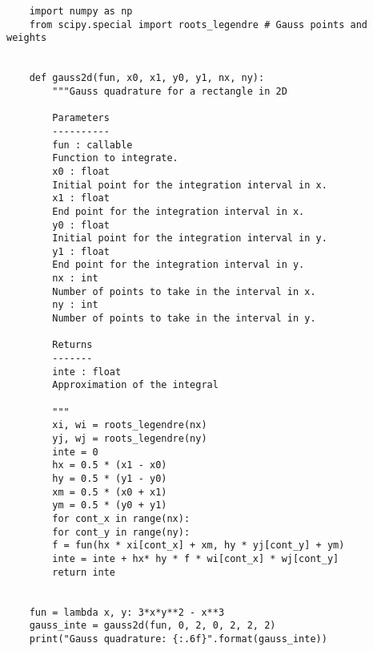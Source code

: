 \begin{verbatim}
    import numpy as np
    from scipy.special import roots_legendre # Gauss points and weights


    def gauss2d(fun, x0, x1, y0, y1, nx, ny):
        """Gauss quadrature for a rectangle in 2D
        
        Parameters
        ----------
        fun : callable
        Function to integrate.
        x0 : float
        Initial point for the integration interval in x.
        x1 : float
        End point for the integration interval in x.
        y0 : float
        Initial point for the integration interval in y.
        y1 : float
        End point for the integration interval in y.
        nx : int
        Number of points to take in the interval in x.
        ny : int
        Number of points to take in the interval in y.
        
        Returns
        -------
        inte : float
        Approximation of the integral
        
        """
        xi, wi = roots_legendre(nx)
        yj, wj = roots_legendre(ny)
        inte = 0
        hx = 0.5 * (x1 - x0)
        hy = 0.5 * (y1 - y0)
        xm = 0.5 * (x0 + x1)
        ym = 0.5 * (y0 + y1)
        for cont_x in range(nx):
        for cont_y in range(ny):
        f = fun(hx * xi[cont_x] + xm, hy * yj[cont_y] + ym)
        inte = inte + hx* hy * f * wi[cont_x] * wj[cont_y]
        return inte


    fun = lambda x, y: 3*x*y**2 - x**3
    gauss_inte = gauss2d(fun, 0, 2, 0, 2, 2, 2)
    print("Gauss quadrature: {:.6f}".format(gauss_inte))
\end{verbatim}

